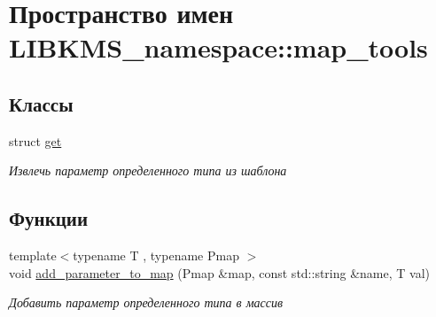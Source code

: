 \hypertarget{namespaceLIBKMS__namespace_1_1map__tools}{\section{Пространство имен L\-I\-B\-K\-M\-S\-\_\-namespace\-:\-:map\-\_\-tools}
\label{namespaceLIBKMS__namespace_1_1map__tools}
}
\subsection*{Классы}
\begin{DoxyCompactItemize}
\item 
struct \hyperlink{structLIBKMS__namespace_1_1map__tools_1_1get}{get}
\begin{DoxyCompactList}\small\item\em Извлечь параметр определенного типа из шаблона \end{DoxyCompactList}\end{DoxyCompactItemize}
\subsection*{Функции}
\begin{DoxyCompactItemize}
\item 
{\footnotesize template$<$typename T , typename Pmap $>$ }\\void \hyperlink{namespaceLIBKMS__namespace_1_1map__tools_a80022a14e1d0067aa2b57e5a40966fdc}{add\-\_\-parameter\-\_\-to\-\_\-map} (Pmap \&map, const std\-::string \&name, T val)
\begin{DoxyCompactList}\small\item\em Добавить параметр определенного типа в массив \end{DoxyCompactList}\end{DoxyCompactItemize}


